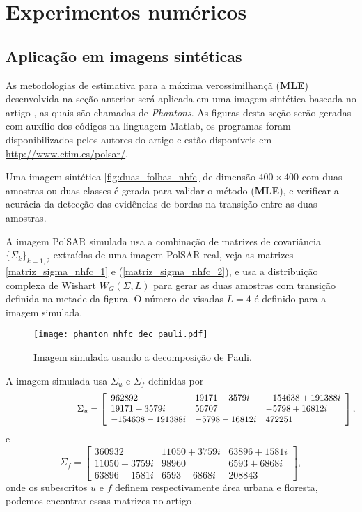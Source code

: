 \chapter{Experimentos numéricos}
\section{Aplicação em imagens sintéticas}\label{cap_acf_sec4}

As metodologias de estimativa para a máxima verossimilhançã (\textbf{MLE}) desenvolvida na seção anterior será aplicada em uma imagem sintética baseada no artigo \citep{gamf}, as quais são chamadas de \textit{Phantons}. As figuras desta seção serão geradas com auxílio dos códigos na linguagem Matlab, os programas foram disponibilizados pelos autores do artigo e estão disponíveis em  \url{http://www.ctim.es/polsar/}.

Uma imagem sintética \eqref{fig:duas_folhas_nhfc} de dimensão $400\times400$ com duas amostras ou duas classes é gerada para validar o método (\textbf{MLE}), e verificar a acurácia da detecção das evidências de bordas na transição entre as duas amostras.  

A imagem PolSAR simulada usa a combinação de matrizes de covariância $\{\Sigma_{k}\}_{k=1,2}$ extraídas de uma imagem PolSAR real, veja as matrizes \eqref{matriz_sigma_nhfc_1} e (\ref{matriz_sigma_nhfc_2}), e usa a distribuição complexa de Wishart $W_G(\Sigma, L)$ para gerar as duas amostras com transição definida na metade da figura. O número de visadas $L=4$ é definido para a imagem simulada.

\begin{figure}[hbt]
\centering
	\texttt{[image: phanton\_nhfc\_dec\_pauli.pdf]}
	\caption{Imagem simulada usando a decomposição de Pauli.}\label{fig:duas_folhas_nhfc}
\end{figure} 

A imagem simulada  usa $\Sigma_u$ e $\Sigma_f$ definidas por
\begin{equation}\label{matriz_sigma_nhfc_1}
	\hspace{2.75cm} \Sigma_{u}= \left[
\begin{array}{lll}
	962892             &19171 - 3579i&     -154638 + 191388i \\
	19171 + 3579i      &56707        &     -5798 + 16812i  \\
	-154638 - 191388i  &-5798 - 16812i&      472251 
\end{array}
\right],
\end{equation}
e
\begin{equation}\label{matriz_sigma_nhfc_2}
 \Sigma_{f}= \left[
\begin{array}{lll}
	360932            & 11050 + 3759i&   63896 + 1581i \\
	11050 - 3759i     & 98960       &   6593 + 6868i \\
	63896  - 1581i    & 6593  - 6868i&   208843
\end{array}
\right],
\end{equation}
onde os subescritos $u$ e $f$ definem respectivamente área urbana e floresta, podemos encontrar essas matrizes no artigo \citep{nhfc}.	

